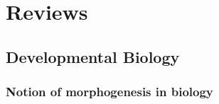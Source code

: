 \documentclass[fleqn,10pt]{wlscirep}
\begin{document}
\section*{Reviews}


%
\subsection*{Developmental Biology}
\subsubsection*{Notion of morphogenesis in biology}
\end{document}

